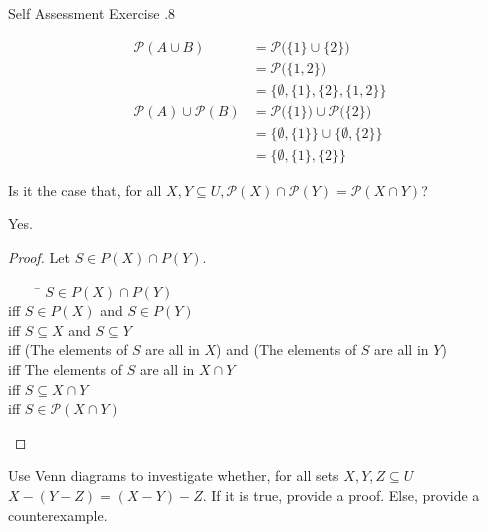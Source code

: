 \documentclass[\main/notes.tex]{subfiles}
\begin{document}
\begin{exercise}{Self Assessment Exercise \thechapter.8}
\begin{questions}
\begin{answer}
\begin{align*}
							\mathcal{P}(A \cup B) &= \mathcal{P}\bigl(\{1\} \cup \{2\}\bigr)\\
							&= \mathcal{P}\bigl(\{1, 2\}\bigr)\\
							&= \bigl\{\emptyset, \{1\}, \{2\}, \{1, 2\}\bigr\}\\
							\mathcal{P}(A) \cup \mathcal{P}(B) &= \mathcal{P}\bigl(\{1\}\bigr) \cup \mathcal{P}\bigl(\{2\}\bigr)\\
							&= \bigl\{\emptyset, \{1\}\bigr\} \cup \bigl\{\emptyset, \{2\}\bigr\}\\
							&= \bigl\{\emptyset, \{1\}, \{2\}\bigr\}
						\end{align*}
					\end{answer}
				\pagebreak
				\item Is it the case that, for all $X, Y \subseteq U,\mathcal{P}(X) \cap \mathcal{P}(Y) = \mathcal{P}(X \cap Y)$?\\
					\begin{answer}
						Yes.
						\begin{proof}
							Let $S \in P(X) \cap P(Y)$.
							\begin{tabbing}
								$\qquad$ \= $S \in P(X) \cap P(Y)$\\
								iff \> $S \in P(X)$ and $S \in P(Y)$\\
								iff \> $S \subseteq X$ and $S \subseteq Y$\\
								iff \> (The elements of $S$ are all in $X$) and (The elements of $S$ are all in $Y$)\\
								iff \> The elements of $S$ are all in $X \cap Y$\\
								iff \> $S \subseteq X \cap Y$\\
								iff \> $S \in \mathcal{P}(X \cap Y)$
							\end{tabbing}
						\end{proof}
					\end{answer}
				\item Use Venn diagrams to investigate whether, for all sets $X, Y, Z \subseteq U$ \\
				$X - (Y - Z) = (X - Y) - Z$. If it is true, provide a proof. Else, provide a counterexample.
					\begin{answer}
						\begin{center}
							\begin{vennthree}[labelA=$X$, labelB=$Y$, labelC=$Z$, tikzoptions={scale=0.8}][$X$]
								\fillA
							\end{vennthree}
							\begin{vennthree}[labelA=$X$, labelB=$Y$, labelC=$Z$, tikzoptions={scale=0.8}][$Y - Z$]

\end{vennthree}
\end{center}
\end{answer}
\end{questions}
\end{exercise}
\end{document}
